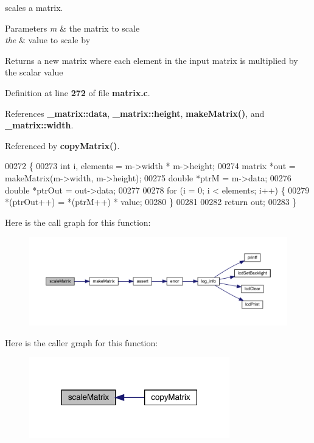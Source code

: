 scales a matrix. 


\begin{DoxyParams}{Parameters}
{\em m} & the matrix to scale \\
\hline
{\em the} & value to scale by \\
\hline
\end{DoxyParams}
\begin{DoxyReturn}{Returns}
a new matrix where each element in the input matrix is multiplied by the scalar value 
\end{DoxyReturn}


Definition at line \textbf{ 272} of file \textbf{ matrix.\+c}.



References \textbf{ \+\_\+matrix\+::data}, \textbf{ \+\_\+matrix\+::height}, \textbf{ make\+Matrix()}, and \textbf{ \+\_\+matrix\+::width}.



Referenced by \textbf{ copy\+Matrix()}.


\begin{DoxyCode}
00272                                              \{
00273   \textcolor{keywordtype}{int} i, elements = m->width * m->height;
00274   matrix *out = makeMatrix(m->width, m->height);
00275   \textcolor{keywordtype}{double} *ptrM = m->data;
00276   \textcolor{keywordtype}{double} *ptrOut = out->data;
00277 
00278   \textcolor{keywordflow}{for} (i = 0; i < elements; i++) \{
00279     *(ptrOut++) = *(ptrM++) * value;
00280   \}
00281 
00282   \textcolor{keywordflow}{return} out;
00283 \}
\end{DoxyCode}
Here is the call graph for this function\+:
\nopagebreak
\begin{figure}[H]
\begin{center}
\leavevmode
\includegraphics[width=350pt]{matrix_8h_a6b7faa6ba9ee987d0777d9d0bd0e7b32_cgraph}
\end{center}
\end{figure}
Here is the caller graph for this function\+:
\nopagebreak
\begin{figure}[H]
\begin{center}
\leavevmode
\includegraphics[width=247pt]{matrix_8h_a6b7faa6ba9ee987d0777d9d0bd0e7b32_icgraph}
\end{center}
\end{figure}
\mbox{\label{matrix_8h_a4794df8b2032f961dd8b2d90276bc417}} 
